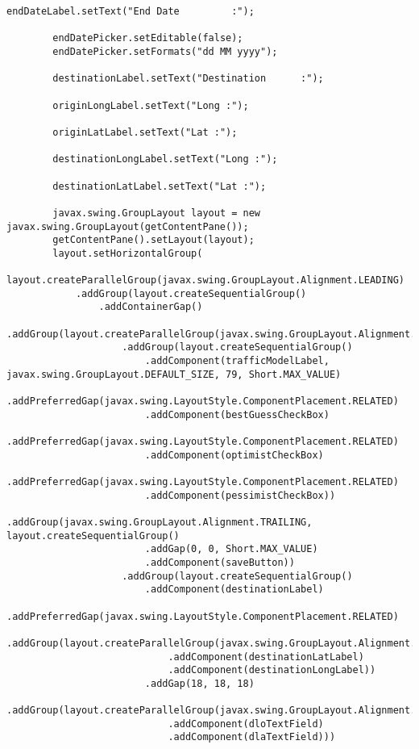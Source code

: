 \begin{lstlisting}[caption= main.java]
        endDateLabel.setText("End Date         :");

        endDatePicker.setEditable(false);
        endDatePicker.setFormats("dd MM yyyy");

        destinationLabel.setText("Destination      :");

        originLongLabel.setText("Long :");

        originLatLabel.setText("Lat :");

        destinationLongLabel.setText("Long :");

        destinationLatLabel.setText("Lat :");

        javax.swing.GroupLayout layout = new javax.swing.GroupLayout(getContentPane());
        getContentPane().setLayout(layout);
        layout.setHorizontalGroup(
            layout.createParallelGroup(javax.swing.GroupLayout.Alignment.LEADING)
            .addGroup(layout.createSequentialGroup()
                .addContainerGap()
                .addGroup(layout.createParallelGroup(javax.swing.GroupLayout.Alignment.LEADING)
                    .addGroup(layout.createSequentialGroup()
                        .addComponent(trafficModelLabel, javax.swing.GroupLayout.DEFAULT_SIZE, 79, Short.MAX_VALUE)
                        .addPreferredGap(javax.swing.LayoutStyle.ComponentPlacement.RELATED)
                        .addComponent(bestGuessCheckBox)
                        .addPreferredGap(javax.swing.LayoutStyle.ComponentPlacement.RELATED)
                        .addComponent(optimistCheckBox)
                        .addPreferredGap(javax.swing.LayoutStyle.ComponentPlacement.RELATED)
                        .addComponent(pessimistCheckBox))
                    .addGroup(javax.swing.GroupLayout.Alignment.TRAILING, layout.createSequentialGroup()
                        .addGap(0, 0, Short.MAX_VALUE)
                        .addComponent(saveButton))
                    .addGroup(layout.createSequentialGroup()
                        .addComponent(destinationLabel)
                        .addPreferredGap(javax.swing.LayoutStyle.ComponentPlacement.RELATED)
                        .addGroup(layout.createParallelGroup(javax.swing.GroupLayout.Alignment.LEADING)
                            .addComponent(destinationLatLabel)
                            .addComponent(destinationLongLabel))
                        .addGap(18, 18, 18)
                        .addGroup(layout.createParallelGroup(javax.swing.GroupLayout.Alignment.LEADING)
                            .addComponent(dloTextField)
                            .addComponent(dlaTextField)))

\end{lstlisting}

